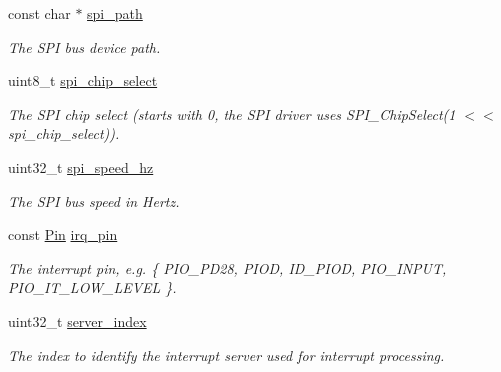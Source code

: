 \begin{DoxyCompactItemize}
\mbox{\label{structatsam__sc16is752__spi__config_a3702fe38a897110a36ed3035d34af57c}} 
const char $\ast$ \mbox{\hyperlink{structatsam__sc16is752__spi__config_a3702fe38a897110a36ed3035d34af57c}{spi\+\_\+path}}
\begin{DoxyCompactList}\small\item\em The S\+PI bus device path. \end{DoxyCompactList}\item 
\mbox{\label{structatsam__sc16is752__spi__config_a97d9f2339ba203c88bc2dd3fa5b64d66}} 
uint8\+\_\+t \mbox{\hyperlink{structatsam__sc16is752__spi__config_a97d9f2339ba203c88bc2dd3fa5b64d66}{spi\+\_\+chip\+\_\+select}}
\begin{DoxyCompactList}\small\item\em The S\+PI chip select (starts with 0, the S\+PI driver uses S\+P\+I\+\_\+\+Chip\+Select(1 $<$$<$ spi\+\_\+chip\+\_\+select)). \end{DoxyCompactList}\item 
\mbox{\label{structatsam__sc16is752__spi__config_a194c589dfffee7bb12672af4997d4dee}} 
uint32\+\_\+t \mbox{\hyperlink{structatsam__sc16is752__spi__config_a194c589dfffee7bb12672af4997d4dee}{spi\+\_\+speed\+\_\+hz}}
\begin{DoxyCompactList}\small\item\em The S\+PI bus speed in Hertz. \end{DoxyCompactList}\item 
\mbox{\label{structatsam__sc16is752__spi__config_ae44f9931ed945c429388ca6450db5ed7}} 
const \mbox{\hyperlink{struct__Pin}{Pin}} \mbox{\hyperlink{structatsam__sc16is752__spi__config_ae44f9931ed945c429388ca6450db5ed7}{irq\+\_\+pin}}
\begin{DoxyCompactList}\small\item\em The interrupt pin, e.\+g. \{ P\+I\+O\+\_\+\+P\+D28, P\+I\+OD, I\+D\+\_\+\+P\+I\+OD, P\+I\+O\+\_\+\+I\+N\+P\+UT, P\+I\+O\+\_\+\+I\+T\+\_\+\+L\+O\+W\+\_\+\+L\+E\+V\+EL \}. \end{DoxyCompactList}\item 
\mbox{\label{structatsam__sc16is752__spi__config_a69427930cf1752b52e2a69308f1e961d}} 
uint32\+\_\+t \mbox{\hyperlink{structatsam__sc16is752__spi__config_a69427930cf1752b52e2a69308f1e961d}{server\+\_\+index}}
\begin{DoxyCompactList}\small\item\em The index to identify the interrupt server used for interrupt processing. \end{DoxyCompactList}\end{DoxyCompactItemize}


